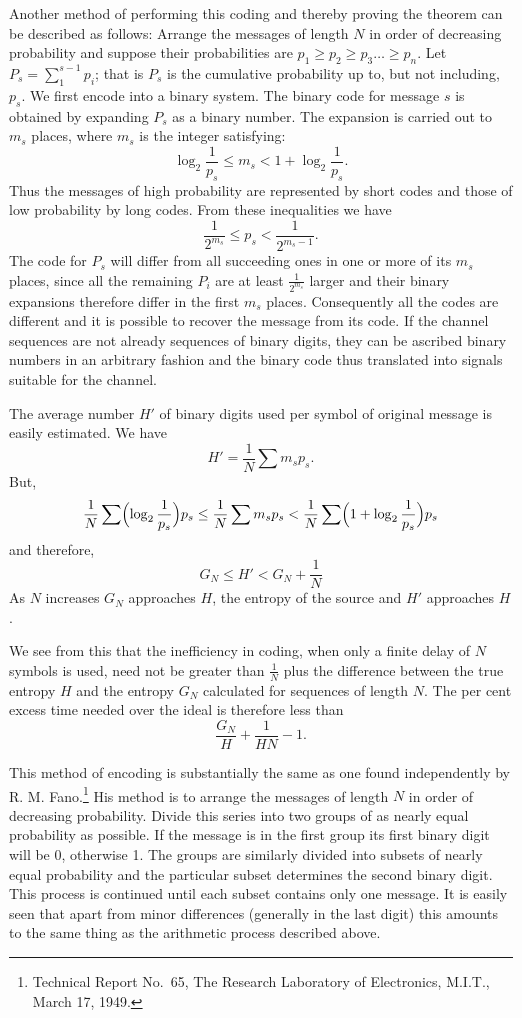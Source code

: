 Another method  of performing this coding and thereby proving the theorem
can be described as follows: Arrange the messages of length $N$ in order
of decreasing probability and suppose their probabilities are $p_1 \ge
p_2 \ge p_3 \dots \ge p_n$.  Let $P_s = \sum_1^{s-1} p_i$; that is
$P_s$ is the cumulative probability up to, but not including, $p_s$.
We first encode into a binary system.  The binary code for message $s$
is obtained by expanding $P_s$ as a binary number.  The expansion is
carried out to $m_s$ places, where $m_s$ is the integer satisfying:
$$
\log_2 \frac{1}{p_s} \le m_s < 1 + \log_2 \frac{1}{p_s}. 
$$
Thus the messages of high probability are represented by short codes
and those of low probability by long codes.  From these inequalities we have
$$
\frac{1}{2^{m_s}} \le p_s < \frac{1}{2^{m_s-1}}.
$$
The code for $P_s$ will differ from all succeeding ones in one or
more of its $m_s$ places, since all the remaining $P_i$ are at least
$\frac{1}{2^{m_s}}$ larger and their binary expansions therefore
differ in the first $m_s$ places.  Consequently all the codes are
different and it is possible to recover the message from its code.
If the channel sequences are not already sequences of binary digits,
they can be ascribed binary numbers in an arbitrary fashion and the
binary code thus translated into signals suitable for the channel.

The average number $H'$ of binary digits used per symbol of original
message is easily estimated.  We have
$$
H' = \frac1N \sum m_s p_s.
$$
But,
$$
\frac1N \sum \Bigl( \log_2 \frac{1}{p_s} \Bigr) p_s
 \le \frac1N \sum m_s p_s < \frac1N
	 \sum \Bigl( 1 + \log_2 \frac{1}{p_s} \Bigr) p_s
$$
and therefore,
$$
G_N \le H' < G_N + \frac1N
$$
As $N$ increases $G_N$ approaches $H$, the entropy of the source and
$H'$ approaches $H$.

We see from this that the inefficiency in coding, when only a finite
delay of $N$ symbols is used, need not be greater than $\frac1N$
plus the difference between the true entropy $H$ and the entropy $G_N$
calculated for sequences of length $N$.  The per cent excess time needed
over the ideal is therefore less than
$$
\frac{G_N}{H} + \frac{1}{HN} - 1.
$$

This method of encoding is substantially the same as one found
independently by R. M. Fano.\footnote{Technical Report No.~65, The
Research Laboratory of Electronics, M.I.T., March 17, 1949.} His method is
to arrange the messages of length $N$ in order of decreasing probability.
Divide this series into two groups of as nearly equal probability as
possible.  If the message is in the first group its first binary digit
will be 0, otherwise 1.  The groups are similarly divided into subsets of
nearly equal probability and the particular subset determines the second
binary digit.  This process is continued until each subset contains
only one message.  It is easily seen that apart from minor differences
(generally in the last digit) this amounts to the same thing as the
arithmetic process described above.

